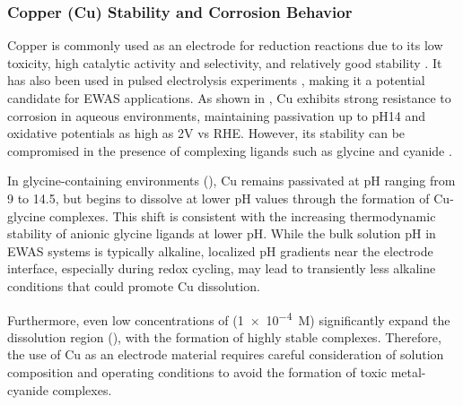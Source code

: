 \documentclass[journal=jacsat,manuscript=article]{achemso}
\begin{document}
\subsubsection{Copper (Cu) Stability and Corrosion Behavior}

Copper is commonly used as an electrode for  reduction reactions due to its low toxicity, high catalytic activity and selectivity, and relatively good stability \cite{Hori1989FormationSolution, Hori1997ElectrochemicalElectrode, Ligt2023ElectrochemicalElectrodes, Deacon-Price2023SolventElectrodes, deRuiter2022ProbingSpectroscopy}. It has also been used in pulsed electrolysis experiments \cite{Mandal2018InvestigatingTime, Zhan2021RevealingSpectroscopy, Liu2021CO2Experiment, Dattila2020ActiveReduction}, making it a potential candidate for EWAS applications. As shown in , Cu exhibits strong resistance to corrosion in aqueous environments, maintaining passivation up to pH14 and oxidative potentials as high as 2V vs RHE. However, its stability can be compromised in the presence of complexing ligands such as glycine and cyanide \cite{Wang2022ThermodynamicDiagrams, Tripathi2009FundamentalConstituents, Skrypnikova2008PeculiaritiesAdditives, OConnor2018ElectrochemicalSolutions}.

In glycine-containing environments (), Cu remains passivated at pH ranging from 9 to 14.5, but begins to dissolve at lower pH values through the formation of Cu-glycine complexes. This shift is consistent with the increasing thermodynamic stability of anionic glycine ligands at lower pH. While the bulk solution pH in EWAS systems is typically alkaline, localized pH gradients near the electrode interface, especially during redox cycling, may lead to transiently less alkaline conditions that could promote Cu dissolution.

Furthermore, even low concentrations of  (\num{1e-4}~M) significantly expand the dissolution region (), with the formation of highly stable  complexes. Therefore, the use of Cu as an electrode material requires careful consideration of solution composition and operating conditions to avoid the formation of toxic metal-cyanide complexes.


\end{document}
